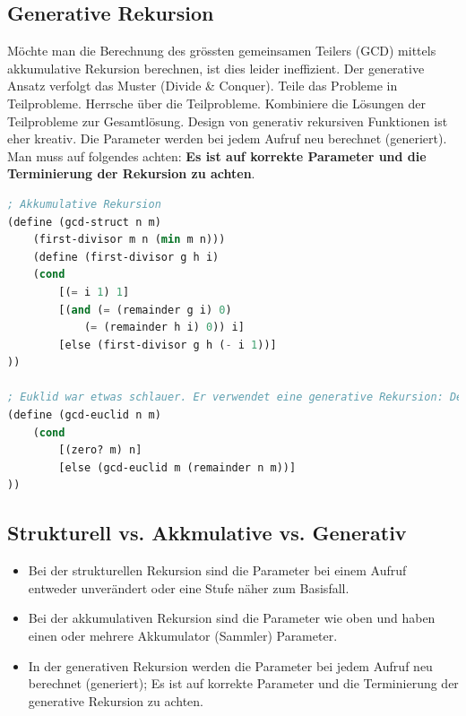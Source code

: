 \subsection{Generative Rekursion}
Möchte man die Berechnung des grössten gemeinsamen Teilers (GCD) mittels akkumulative Rekursion berechnen, ist dies leider ineffizient. Der generative Ansatz verfolgt das Muster (Divide \& Conquer). Teile das Probleme in Teilprobleme. Herrsche über die Teilprobleme. Kombiniere die Lösungen der Teilprobleme zur Gesamtlösung. Design von generativ rekursiven Funktionen ist eher kreativ. Die Parameter werden bei jedem Aufruf neu berechnet (generiert). Man muss auf folgendes achten: \textbf{Es ist auf korrekte Parameter und die Terminierung der Rekursion zu achten}.

\begin{lstlisting}[language=Lisp, caption=Generative Rekursion - Beispiel GCD]
; Akkumulative Rekursion
(define (gcd-struct n m)
	(first-divisor m n (min m n)))
	(define (first-divisor g h i)
	(cond
		[(= i 1) 1]
		[(and (= (remainder g i) 0)
			(= (remainder h i) 0)) i]
		[else (first-divisor g h (- i 1))]
))

; Euklid war etwas schlauer. Er verwendet eine generative Rekursion: Der trivial lösbare Fall ist m=0. Und der generative Schritt gcd-euclid mit n und (remainder n m) als Argumente. Die Argumente basieren auf keinem rekurisven Datentypen. Die Argumente werden bei jedem Aufruf neu berechnet.
(define (gcd-euclid n m)
	(cond
		[(zero? m) n]
		[else (gcd-euclid m (remainder n m))]
))
\end{lstlisting}

\subsection{Strukturell vs. Akkmulative vs. Generativ}

\begin{itemize}
	\item Bei der strukturellen Rekursion sind die Parameter bei einem Aufruf entweder unverändert oder eine Stufe näher zum Basisfall.
	\item Bei der akkumulativen Rekursion sind die Parameter wie oben und haben einen oder mehrere Akkumulator (Sammler) Parameter.
	\item In der generativen Rekursion werden die Parameter bei jedem Aufruf neu berechnet (generiert); Es ist auf  korrekte Parameter und die Terminierung der generative Rekursion zu achten.
\end{itemize}

